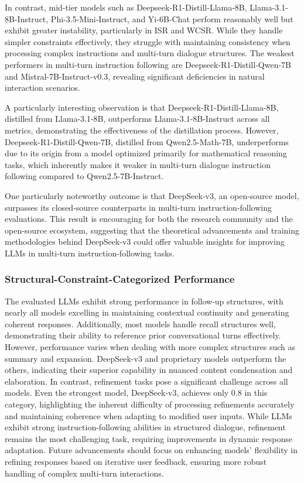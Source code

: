 In contrast, mid-tier models such as Deepseek-R1-Distill-Llama-8B, Llama-3.1-8B-Instruct, Phi-3.5-Mini-Instruct, and Yi-6B-Chat perform reasonably well but exhibit greater instability, particularly in ISR and WCSR. 
While they handle simpler constraints effectively, they struggle with maintaining consistency when processing complex instructions and multi-turn dialogue structures. 
The weakest performers in multi-turn instruction following are Deepseek-R1-Distill-Qwen-7B and Mistral-7B-Instruct-v0.3, revealing significant deficiencies in natural interaction scenarios.

A particularly interesting observation is that Deepseek-R1-Distill-Llama-8B, distilled from Llama-3.1-8B, outperforms Llama-3.1-8B-Instruct across all metrics, demonstrating the effectiveness of the distillation process. 
However, Deepseek-R1-Distill-Qwen-7B, distilled from Qwen2.5-Math-7B, underperforms due to its origin from a model optimized primarily for mathematical reasoning tasks, which inherently makes it weaker in multi-turn dialogue instruction following compared to Qwen2.5-7B-Instruct.

One particularly noteworthy outcome is that DeepSeek-v3, an open-source model, surpasses its closed-source counterparts in multi-turn instruction-following evaluations. 
This result is encouraging for both the research community and the open-source ecosystem, suggesting that the theoretical advancements and training methodologies behind DeepSeek-v3 could offer valuable insights for improving LLMs in multi-turn instruction-following tasks.
 

\subsubsection*{Structural-Constraint-Categorized Performance}

The evaluated LLMs exhibit strong performance in follow-up structures, with nearly all models excelling in maintaining contextual continuity and generating coherent responses.
Additionally, most models handle recall structures well, demonstrating their ability to reference prior conversational turns effectively.
However, performance varies when dealing with more complex structures such as summary and expansion.
DeepSeek-v3 and proprietary models outperform the others, indicating their superior capability in nuanced content condensation and elaboration.
In contrast, refinement tasks pose a significant challenge across all models.  
Even the strongest model, DeepSeek-v3, achieves only 0.8 in this category, highlighting the inherent difficulty of processing refinements accurately and maintaining coherence when adapting to modified user inputs.
While LLMs exhibit strong instruction-following abilities in structured dialogue, refinement remains the most challenging task, requiring improvements in dynamic response adaptation. 
Future advancements should focus on enhancing models' flexibility in refining responses based on iterative user feedback, ensuring more robust handling of complex multi-turn interactions.

